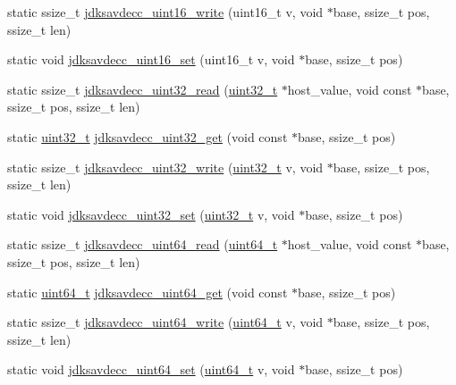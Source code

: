\begin{DoxyCompactItemize}
static ssize\+\_\+t \hyperlink{group__endian_ga4c0851ce17bde5306fdb04bfb5b75af1}{jdksavdecc\+\_\+uint16\+\_\+write} (uint16\+\_\+t v, void $\ast$base, ssize\+\_\+t pos, ssize\+\_\+t len)
\item 
static void \hyperlink{group__endian_ga14b9eeadc05f94334096c127c955a60b}{jdksavdecc\+\_\+uint16\+\_\+set} (uint16\+\_\+t v, void $\ast$base, ssize\+\_\+t pos)
\item 
static ssize\+\_\+t \hyperlink{group__endian_gaf75f53076978e7b51f12c19414e6070e}{jdksavdecc\+\_\+uint32\+\_\+read} (\hyperlink{parse_8c_a6eb1e68cc391dd753bc8ce896dbb8315}{uint32\+\_\+t} $\ast$host\+\_\+value, void const $\ast$base, ssize\+\_\+t pos, ssize\+\_\+t len)
\item 
static \hyperlink{parse_8c_a6eb1e68cc391dd753bc8ce896dbb8315}{uint32\+\_\+t} \hyperlink{group__endian_gaefcf5bd4f368997a82f358ab89052d6b}{jdksavdecc\+\_\+uint32\+\_\+get} (void const $\ast$base, ssize\+\_\+t pos)
\item 
static ssize\+\_\+t \hyperlink{group__endian_ga5c8d1aadb6e4ea355503a1945cfdbb92}{jdksavdecc\+\_\+uint32\+\_\+write} (\hyperlink{parse_8c_a6eb1e68cc391dd753bc8ce896dbb8315}{uint32\+\_\+t} v, void $\ast$base, ssize\+\_\+t pos, ssize\+\_\+t len)
\item 
static void \hyperlink{group__endian_ga59b24ae6f7f47ca4d24ea337543162bf}{jdksavdecc\+\_\+uint32\+\_\+set} (\hyperlink{parse_8c_a6eb1e68cc391dd753bc8ce896dbb8315}{uint32\+\_\+t} v, void $\ast$base, ssize\+\_\+t pos)
\item 
static ssize\+\_\+t \hyperlink{group__endian_ga6ef812126b8cf7560284fd4d921b4f8c}{jdksavdecc\+\_\+uint64\+\_\+read} (\hyperlink{parse_8c_aec6fcb673ff035718c238c8c9d544c47}{uint64\+\_\+t} $\ast$host\+\_\+value, void const $\ast$base, ssize\+\_\+t pos, ssize\+\_\+t len)
\item 
static \hyperlink{parse_8c_aec6fcb673ff035718c238c8c9d544c47}{uint64\+\_\+t} \hyperlink{group__endian_gac8c2b48b7d7db101708e0197e366ac42}{jdksavdecc\+\_\+uint64\+\_\+get} (void const $\ast$base, ssize\+\_\+t pos)
\item 
static ssize\+\_\+t \hyperlink{group__endian_gaa294fd85c2d887032dad294c6833c903}{jdksavdecc\+\_\+uint64\+\_\+write} (\hyperlink{parse_8c_aec6fcb673ff035718c238c8c9d544c47}{uint64\+\_\+t} v, void $\ast$base, ssize\+\_\+t pos, ssize\+\_\+t len)
\item 
static void \hyperlink{group__endian_ga48c6225616d8c003861be5c423a36631}{jdksavdecc\+\_\+uint64\+\_\+set} (\hyperlink{parse_8c_aec6fcb673ff035718c238c8c9d544c47}{uint64\+\_\+t} v, void $\ast$base, ssize\+\_\+t pos)

\end{DoxyCompactItemize}
